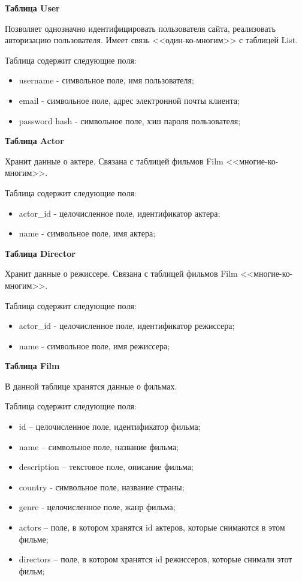 \documentclass[a4paper, 14pt]{article}
\begin{document}
	\hfill \break
	
	{\bf Таблица User}
	
	Позволяет однозначно идентифицировать пользователя сайта, реализовать авторизацию пользователя. Имеет связь <<один-ко-многим>> с таблицей List. 
	
	Таблица содержит следующие поля:
	\begin{itemize}
		\item username - символьное поле, имя пользователя;
		\item email - символьное поле, адрес электронной почты клиента;
		\item password hash - символьное поле, хэш пароля пользователя;
	\end{itemize}
	
	\hfill \break
	
	{\bf Таблица Actor}
	
	Хранит данные о актере. Связана с таблицей фильмов Film <<многие-ко-многим>>.
	
	Таблица содержит следующие поля:
	\begin{itemize}
		\item actor\_id - целочисленное поле, идентификатор актера;
		\item name - символьное поле, имя актера;
	\end{itemize}
	
	\hfill \break
	
	{\bf Таблица Director}
	
	Хранит данные о режиссере. Связана с таблицей фильмов Film <<многие-ко-многим>>.
	
	Таблица содержит следующие поля:
	\begin{itemize}
		\item actor\_id - целочисленное поле, идентификатор режиссера;
		\item name - символьное поле, имя режиссера;
	\end{itemize}
	
	\hfill \break
	
	{\bf Таблица Film}
	
	В данной таблице хранятся данные о фильмах. 
	
	Таблица содержит следующие поля:
	\begin{itemize}
		\item id – целочисленное поле, идентификатор фильма;
		\item name – символьное поле, название фильма;
		\item description – текстовое поле, описание фильма;
		\item country - символьное поле, название страны;
		\item genre - целочисленное поле, жанр фильма;
		\item actors – поле, в котором хранятся id актеров, которые снимаются в этом фильме;
		\item directors – поле, в котором хранятся id режиссеров, которые снимали этот фильм;
	\end{itemize}
	
\end{document}
